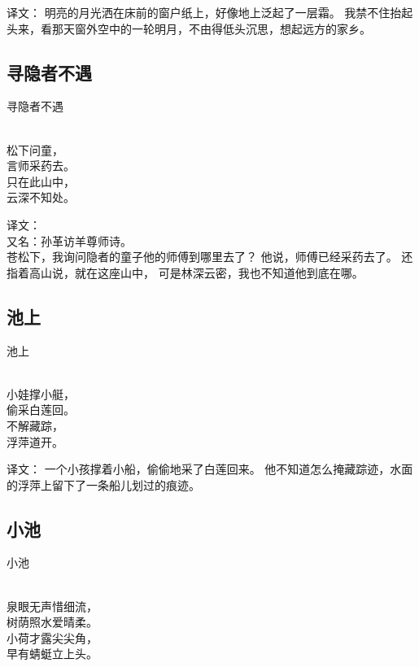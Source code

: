 译文：
明亮的月光洒在床前的窗户纸上，好像地上泛起了一层霜。 我禁不住抬起头来，看那天窗外空中的一轮明月，不由得低头沉思，想起远方的家乡。

\subsection{寻隐者不遇}
\begin{pinyinscope}
	\noindent \huge 寻隐者不遇
	
	  \\
	
	\noindent 松下问童，\\言师采药去。\\
	只在此山中，\\云深不知处。
\end{pinyinscope}

\noindent 译文：\\
又名：孙革访羊尊师诗。\\苍松下，我询问隐者的童子他的师傅到哪里去了？
他说，师傅已经采药去了。
还指着高山说，就在这座山中，
可是林深云密，我也不知道他到底在哪。

\subsection{池上}
\begin{pinyinscope}
	\noindent \huge 池上
	
	  \\
	
	\noindent 小娃撑小艇，\\偷采白莲回。\\
	不解藏踪，\\浮萍道开。
\end{pinyinscope}

译文：
一个小孩撑着小船，偷偷地采了白莲回来。
他不知道怎么掩藏踪迹，水面的浮萍上留下了一条船儿划过的痕迹。

\subsection{小池}
\begin{pinyinscope}
	\noindent \huge 小池
	
	  \\
	
	\noindent 泉眼无声惜细流，\\树荫照水爱晴柔。\\
	小荷才露尖尖角，\\早有蜻蜓立上头。
\end{pinyinscope}

